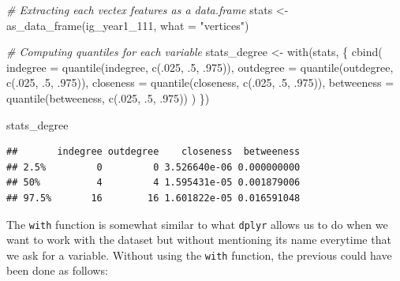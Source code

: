 \documentclass[
]{book}
\newenvironment{Shaded}{\begin{snugshade}}{\end{snugshade}}
\newcommand{\AttributeTok}[1]{\textcolor[rgb]{0.77,0.63,0.00}{#1}}
\newcommand{\CommentTok}[1]{\textcolor[rgb]{0.56,0.35,0.01}{\textit{#1}}}
\newcommand{\DecValTok}[1]{\textcolor[rgb]{0.00,0.00,0.81}{#1}}
\newcommand{\FunctionTok}[1]{\textcolor[rgb]{0.00,0.00,0.00}{#1}}
\newcommand{\NormalTok}[1]{#1}
\newcommand{\OtherTok}[1]{\textcolor[rgb]{0.56,0.35,0.01}{#1}}
\newcommand{\StringTok}[1]{\textcolor[rgb]{0.31,0.60,0.02}{#1}}
\begin{document}
\begin{Shaded}
\begin{Highlighting}[]
\CommentTok{\# Extracting each vectex features as a data.frame}
\NormalTok{stats }\OtherTok{\textless{}{-}} \FunctionTok{as\_data\_frame}\NormalTok{(ig\_year1\_111, }\AttributeTok{what =} \StringTok{"vertices"}\NormalTok{)}

\CommentTok{\# Computing quantiles for each variable}
\NormalTok{stats\_degree }\OtherTok{\textless{}{-}} \FunctionTok{with}\NormalTok{(stats, \{}
 \FunctionTok{cbind}\NormalTok{(}
   \AttributeTok{indegree   =} \FunctionTok{quantile}\NormalTok{(indegree, }\FunctionTok{c}\NormalTok{(.}\DecValTok{025}\NormalTok{, .}\DecValTok{5}\NormalTok{, .}\DecValTok{975}\NormalTok{)),}
   \AttributeTok{outdegree  =} \FunctionTok{quantile}\NormalTok{(outdegree, }\FunctionTok{c}\NormalTok{(.}\DecValTok{025}\NormalTok{, .}\DecValTok{5}\NormalTok{, .}\DecValTok{975}\NormalTok{)),}
   \AttributeTok{closeness  =} \FunctionTok{quantile}\NormalTok{(closeness, }\FunctionTok{c}\NormalTok{(.}\DecValTok{025}\NormalTok{, .}\DecValTok{5}\NormalTok{, .}\DecValTok{975}\NormalTok{)),}
   \AttributeTok{betweeness =} \FunctionTok{quantile}\NormalTok{(betweeness, }\FunctionTok{c}\NormalTok{(.}\DecValTok{025}\NormalTok{, .}\DecValTok{5}\NormalTok{, .}\DecValTok{975}\NormalTok{))}
\NormalTok{ )}
\NormalTok{\})}

\NormalTok{stats\_degree}
\end{Highlighting}
\end{Shaded}

\begin{verbatim}
##       indegree outdegree    closeness  betweeness
## 2.5%         0         0 3.526640e-06 0.000000000
## 50%          4         4 1.595431e-05 0.001879006
## 97.5%       16        16 1.601822e-05 0.016591048
\end{verbatim}

The \texttt{with} function is somewhat similar to what \texttt{dplyr} allows us to do when we want to work with the dataset but without mentioning its name everytime that we ask for a variable. Without using the \texttt{with} function, the previous could have been done as follows:
\end{document}
